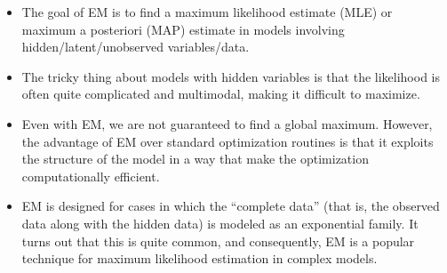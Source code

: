 \documentclass[12pt]{article}
\begin{document}
\begin{itemize}
\item  The goal of EM is to find a maximum likelihood estimate (MLE) or maximum a posteriori (MAP) estimate in models involving hidden/latent/unobserved variables/data.
\item The tricky thing about models with hidden variables is that the likelihood is often quite complicated and multimodal, making it difficult to maximize.
\item Even with EM, we are not guaranteed to find a global maximum. However, the advantage of EM over standard optimization routines is that it exploits the structure of the model in a way that make the optimization computationally efficient.
\item EM is designed for cases in which the ``complete data'' (that is, the observed data along with the hidden data) is modeled as an exponential family. It turns out that this is quite common, and consequently, EM is a popular technique for maximum likelihood estimation in complex models.
\end{itemize}
\end{document}
